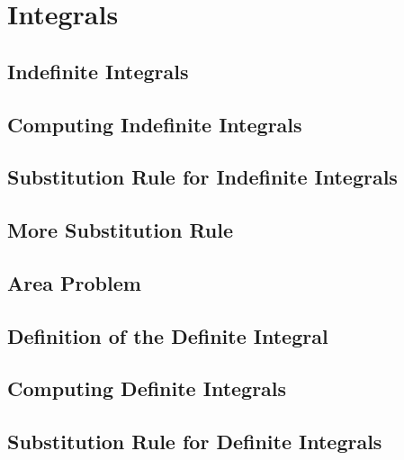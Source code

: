 \documentclass[../satmath.tex]{subfiles}
\begin{document}
\chapter{Integrals}
\section{Indefinite Integrals}
\section{Computing Indefinite Integrals}
\section{Substitution Rule for Indefinite Integrals}
\section{More Substitution Rule}
\section{Area Problem}
\section{Definition of the Definite Integral}
\section{Computing Definite Integrals}
\section{Substitution Rule for Definite Integrals}
\end{document}
